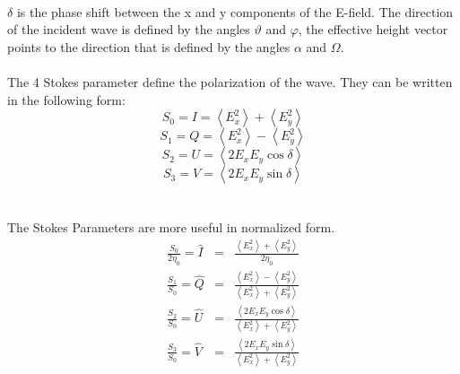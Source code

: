 \documentclass[a4paper,10pt]{thesis}
\begin{document}
\paragraph*{}
$\delta$ is the phase shift between the x and y components of the E-field. The direction of the incident wave is defined by the angles $\vartheta$ and $\varphi$, the effective height vector points to the direction that is defined by the angles $\alpha$ and $\Omega$.
\paragraph*{}
The 4 Stokes parameter define the polarization of the wave. They can be written in the following form:
\begin{equation}
S_0=I= \left\langle E_{x}^2\right\rangle +\left\langle E_{y}^2\right\rangle
\end{equation}
\begin{equation}
S_1=Q=\left\langle E_{x}^2\right\rangle-\left\langle E_{y}^2\right\rangle
\end{equation}
\begin{equation}
S_2=U=\left\langle2E_{x} E_{y} \cos \delta \right\rangle
\end{equation}
\begin{equation}
S_3=V=\left\langle2E_{x} E_{y} \sin\delta\right\rangle
\end{equation}
\\
\paragraph*{}
The Stokes Parameters are more useful in normalized form.
\begin{eqnarray}
\frac{S_0}{2\eta_0} = \hat{I} &=& \frac{\left\langle E_{x}^2\right\rangle +\left\langle E_{y}^2\right\rangle}{2\eta_0} \label{norm_stokes_1}
\\
\frac{S_1}{S_0}=\hat{Q}&=&\frac{\left\langle E_{x}^2\right\rangle-\left\langle E_{y}^2\right\rangle}{\left\langle E_{x}^2\right\rangle +\left\langle E_{y}^2\right\rangle}\label{norm_stokes_2}
\\
\frac{S_2}{S_0}=\hat{U}&=&\frac{\left\langle2E_{x} E_{y} \cos\delta\right\rangle}{\left\langle E_{x}^2\right\rangle +\left\langle E_{y}^2\right\rangle}\label{norm_stokes_3}
\\
\frac{S_3}{S_0}=\hat{V}&=&\frac{\left\langle2E_{x} E_{y} \sin\delta\right\rangle}{\left\langle E_{x}^2\right\rangle +\left\langle E_{y}^2\right\rangle}\label{norm_stokes_4}
\end{eqnarray}
\end{document}
